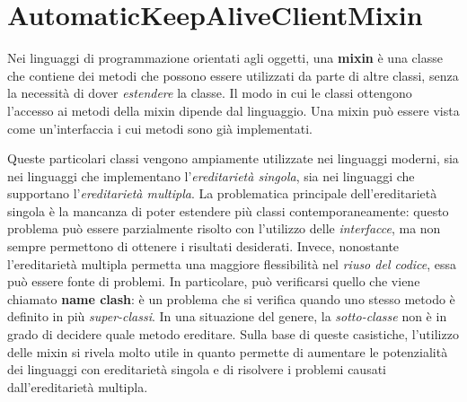 \chapter{AutomaticKeepAliveClientMixin}
\label{cap:B}

Nei linguaggi di programmazione orientati agli oggetti, una \textbf{mixin} è una classe che contiene dei metodi che possono essere utilizzati da parte di altre classi, senza la necessità di dover \textit{estendere} la classe. Il modo in cui le classi ottengono l'accesso ai metodi della mixin dipende dal linguaggio. Una mixin può essere vista come un'interfaccia i cui metodi sono già implementati.

Queste particolari classi vengono ampiamente utilizzate nei linguaggi moderni, sia nei linguaggi che implementano l'\textit{ereditarietà singola}, sia nei linguaggi che supportano l'\textit{ereditarietà multipla}. La problematica principale dell'ereditarietà singola è la mancanza di poter estendere più classi contemporaneamente: questo problema può essere parzialmente risolto con l'utilizzo delle \textit{interfacce}, ma non sempre permettono di ottenere i risultati desiderati. Invece, nonostante l'ereditarietà multipla permetta una maggiore flessibilità nel \textit{riuso del codice}, essa può essere fonte di problemi. In particolare, può verificarsi quello che viene chiamato \textbf{name clash}: è un problema che si verifica quando uno stesso metodo è definito in più \textit{super-classi}. In una situazione del genere, la \textit{sotto-classe} non è in grado di decidere quale metodo ereditare. Sulla base di queste casistiche, l'utilizzo delle mixin si rivela molto utile in quanto permette di aumentare le potenzialità dei linguaggi con ereditarietà singola e di risolvere i problemi causati dall'ereditarietà multipla.

